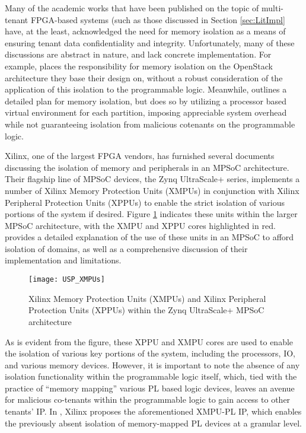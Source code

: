 Many of the academic works that have been published on the topic of multi-tenant FPGA-based systems (such as those discussed in Section \ref{sec:LitImpl} have, at the least, acknowledged the need for memory isolation as a means of ensuring tenant data confidentiality and integrity. Unfortunately, many of these discussions are abstract in nature, and lack concrete implementation. For example, \cite{bag_cryptographically_2020} places the responsibility for memory isolation on the OpenStack architecture they base their design on, without a robust consideration of the application of this isolation to the programmable logic. Meanwhile, \cite{chen_enabling_2014} outlines a detailed plan for memory isolation, but does so by utilizing a processor based virtual environment for each partition, imposing appreciable system overhead while not guaranteeing isolation from malicious cotenants on the programmable logic.

Xilinx, one of the largest FPGA vendors, has furnished several documents discussing the isolation of memory and peripherals in an MPSoC architecture. Their flagship line of MPSoC devices, the Zynq UltraScale+ series, implements a number of Xilinx Memory Protection Units (XMPUs) in conjunction with Xilinx Peripheral Protection Units (XPPUs) to enable the strict isolation of various portions of the system if desired. Figure \ref{fig:XMPPUs} indicates these units within the larger MPSoC architecture, with the XMPU and XPPU cores highlighted in red. \cite{mcneil_isolation_2021} provides a detailed explanation of the use of these units in an MPSoC to afford isolation of domains, as well as a comprehensive discussion of their implementation and limitations.

\begin{figure}[ht]
    \centering
    \texttt{[image: USP\_XMPUs]}
    \caption [XMPU and XPPUs in a Zynq UltraScale+]{Xilinx Memory Protection Units (XMPUs) and Xilinx Peripheral Protection Units (XPPUs) within the Zynq UltraScale+ MPSoC architecture}
    \label{fig:XMPPUs}
\end{figure}

As is evident from the figure, these XPPU and XMPU cores are used to enable the isolation of various key portions of the system, including the processors, IO, and various memory devices. However, it is important to note the absence of any isolation functionality within the programmable logic itself, which, tied with the practice of ``memory mapping'' various PL based logic devices, leaves an avenue for malicious co-tenants within the programmable logic to gain access to other tenants' IP. In \cite{noauthor_memory_2021}, Xilinx proposes the aforementioned XMPU-PL IP, which enables the previously absent isolation of memory-mapped PL devices at a granular level. 

